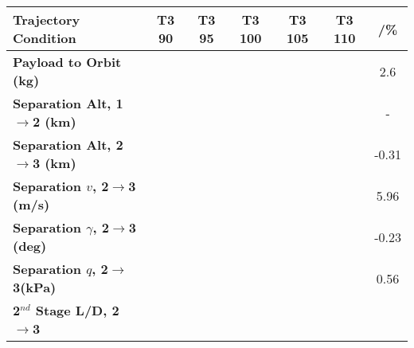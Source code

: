 \begin{tabular}{l c c c c c c} 
	\hline \textbf{Trajectory Condition}
	&T3 90
	&T3 95
	&T3 100
	&T3 105
	&T3 110
	& /\%
	\\
	\hline \textbf{Payload to Orbit (kg)}
	& \PayloadToOrbitTThreeNinetyNoReturn
	& \PayloadToOrbitTThreeNinetyFiveNoReturn
	& \PayloadToOrbitTThreeStandardNoReturn
	& \PayloadToOrbitTThreeOneHundredFiveNoReturn
	& \PayloadToOrbitTThreeOneHundredTenNoReturn
	&2.6
	\\
	\textbf{Separation Alt, 1$\rightarrow$2 (km)}
	& \firstsecondSeparationAltTThreeNinetyNoReturn
	& \firstsecondSeparationAltTThreeNinetyFiveNoReturn
	& \firstsecondSeparationAltTThreeStandardNoReturn
	& \firstsecondSeparationAltTThreeOneHundredFiveNoReturn
	& \firstsecondSeparationAltTThreeOneHundredTenNoReturn
	& -
	\\
	\textbf{Separation Alt, 2$\rightarrow$3 (km)}
	& \secondthirdSeparationAltTThreeNinetyNoReturn
	& \secondthirdSeparationAltTThreeNinetyFiveNoReturn
	& \secondthirdSeparationAltTThreeStandardNoReturn
	& \secondthirdSeparationAltTThreeOneHundredFiveNoReturn
	& \secondthirdSeparationAltTThreeOneHundredTenNoReturn
	&-0.31
	\\
	\textbf{Separation $v$, 2$\rightarrow$3 (m/s)}
	& \secondthirdSeparationvTThreeNinetyNoReturn
	& \secondthirdSeparationvTThreeNinetyFiveNoReturn
	& \secondthirdSeparationvTThreeStandardNoReturn
	& \secondthirdSeparationvTThreeOneHundredFiveNoReturn
	& \secondthirdSeparationvTThreeOneHundredTenNoReturn
	&5.96
	\\
	\textbf{Separation $\gamma$, 2$\rightarrow$3 (deg)}
	& \secondthirdSeparationgammaTThreeNinetyNoReturn
	& \secondthirdSeparationgammaTThreeNinetyFiveNoReturn
	& \secondthirdSeparationgammaTThreeStandardNoReturn
	& \secondthirdSeparationgammaTThreeOneHundredFiveNoReturn
	& \secondthirdSeparationgammaTThreeOneHundredTenNoReturn
	&-0.23
	\\
	\textbf{Separation $q$, 2$\rightarrow$3(kPa)}
	& \secondthirdSeparationqTThreeNinetyNoReturn
	& \secondthirdSeparationqTThreeNinetyFiveNoReturn
	& \secondthirdSeparationqTThreeStandardNoReturn
	& \secondthirdSeparationqTThreeOneHundredFiveNoReturn
	& \secondthirdSeparationqTThreeOneHundredTenNoReturn
	&0.56
	\\
	\textbf{2$^{nd}$ Stage L/D, 2$\rightarrow$3}
	& \secondthirdSeparationLDTThreeNinetyNoReturn
	& \secondthirdSeparationLDTThreeNinetyFiveNoReturn
	& \secondthirdSeparationLDTThreeStandardNoReturn
	& \secondthirdSeparationLDTThreeOneHundredFiveNoReturn
	& \secondthirdSeparationLDTThreeOneHundredTenNoReturn

\end{tabular}
